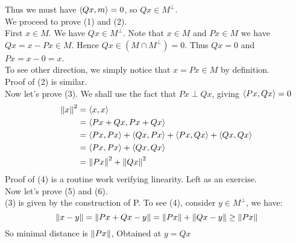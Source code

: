 \documentclass{article}
\begin{document}
\begin{proposition}
	Thus we must have $\left<{Qx},{m}\right>=0$, so $Qx\in M^\perp$.\\
	We proceed to prove (1) and (2).\\
	First $x\in M$. We have $Qx\in M^\perp$. Note that $x\in M$ and $Px\in M$ we have $Qx=x-Px\in M$. Hence $Qx\in(M\cap M^\perp)={0}$. Thus $Qx=0$ and $Px=x-0=x$. \\
	To see other direction, we simply notice that $x=Px\in M$ by definition.\\
	Proof of (2) is similar.\\
	Now let's prove (3). We shall use the fact that $Px\perp Qx$, giving $\left<{Px},{Qx}\right>=0$
	\begin{equation}
		\begin{split}
			\left\|{x}\right\|^2&=\left<{x},{x}\right>\\
			&=\left<{Px+Qx},{Px+Qx}\right>\\
			&=\left<{Px},{Px}\right>+\left<{Qx},{Px}\right>+\left<{Px},{Qx}\right>+\left<{Qx},{Qx}\right>\\
			&=\left<{Px},{Px}\right>+\left<{Qx},{Qx}\right>\\
			&=\left\|{Px}\right\|^2+\left\|{Qx}\right\|^2
		\end{split}
	\end{equation}
	Proof of (4) is a routine work verifying linearity. Left as an exercise.\\
	Now let's prove (5) and (6).\\
	(3) is given by the construction of P. To see (4), consider $y\in M^\perp$, we have:
	$$
		\left\|{x-y}\right\|=\left\|{Px+Qx-y}\right\|=\left\|{Px}\right\|+\left\|{Qx-y}\right\|\geq \left\|{Px}\right\|
	$$
	So minimal distance is $\left\|{Px}\right\|$, Obtained at $y=Qx$
\end{proposition}
\end{document}
